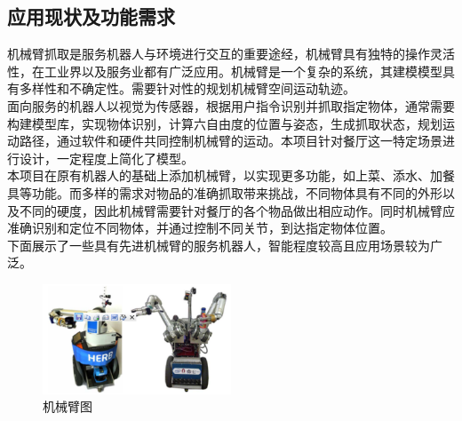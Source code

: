 \documentclass[11pt]{article}
\begin{document}
\subsection{应用现状及功能需求}
机械臂抓取是服务机器人与环境进行交互的重要途经，机械臂具有独特的操作灵活性，在工业界以及服务业都有广泛应用。机械臂是一个复杂的系统，其建模模型具有多样性和不确定性。需要针对性的规划机械臂空间运动轨迹。\\
面向服务的机器人以视觉为传感器，根据用户指令识别并抓取指定物体，通常需要构建模型库，实现物体识别，计算六自由度的位置与姿态，生成抓取状态，规划运动路径，通过软件和硬件共同控制机械臂的运动。本项目针对餐厅这一特定场景进行设计，一定程度上简化了模型。\\
本项目在原有机器人的基础上添加机械臂，以实现更多功能，如上菜、添水、加餐具等功能。而多样的需求对物品的准确抓取带来挑战，不同物体具有不同的外形以及不同的硬度，因此机械臂需要针对餐厅的各个物品做出相应动作。同时机械臂应准确识别和定位不同物体，并通过控制不同关节，到达指定物体位置。\\
下面展示了一些具有先进机械臂的服务机器人，智能程度较高且应用场景较为广泛。
\begin{figure}[H]
    \centering
    \hspace{1cm}
\end{figure}
\begin{figure}[H] %
    \centering %
    \includegraphics[width=0.5\textwidth]{3} %
    \caption{机械臂图}
\end{figure}
\end{document}
